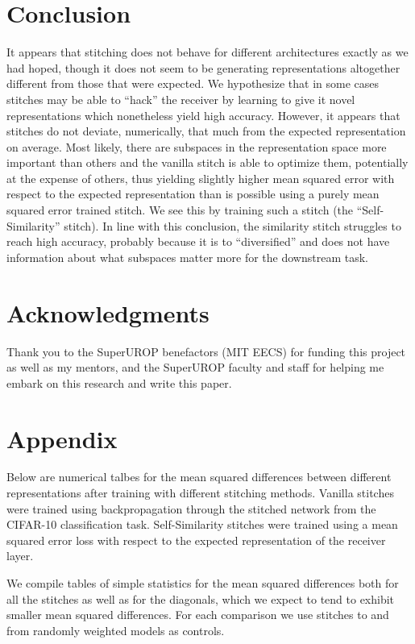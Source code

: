 \documentclass{article} %
\begin{document}
\section{Conclusion}
\label{Conclusion}
It appears that stitching does not behave for different architectures exactly as we had hoped, though it does not seem
to be generating representations altogether different from those that were expected. We hypothesize that in some cases
stitches may be able to ``hack'' the receiver by learning to give it novel representations which nonetheless yield high
accuracy. However, it appears that stitches do not deviate, numerically, that much from the expected representation on
average. Most likely, there are subspaces in the representation space more important than others and the vanilla stitch
is able to optimize them, potentially at the expense of others, thus yielding slightly higher mean squared error with
respect to the expected representation than is possible using a purely mean squared error trained stitch. We see this
by training such a stitch (the ``Self-Similarity'' stitch). In line with this conclusion, the similarity stitch struggles
to reach high accuracy, probably because it is to ``diversified'' and does not have information about what subspaces
matter more for the downstream task.

\section*{Acknowledgments}
\label{Acknowledgments}
Thank you to the SuperUROP benefactors (MIT EECS) for funding this project as well as my mentors, and the
SuperUROP faculty and staff for helping me embark on this research and write this paper.
\newpage


\newpage
\appendix
\section{Appendix}
\label{Appendix}
Below are numerical talbes for the mean squared differences between different representations
after training with different stitching methods. Vanilla stitches were trained using backpropagation
through the stitched network from the CIFAR-10 classification task. Self-Similarity stitches were
trained using a mean squared error loss with respect to the expected representation of the
receiver layer.

We compile tables of simple statistics for the mean squared differences both for all the stitches as well
as for the diagonals, which we expect to tend to exhibit smaller mean squared differences. For each comparison
we use stitches to and from randomly weighted models as controls.
\end{document}
